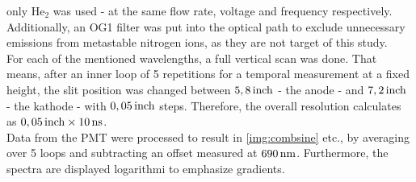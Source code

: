 \documentclass[a4paper,10pt,twoside]{article}
\begin{document}
			\begin{multicols*}{2}
			
				 only He$_2$ was used - at the same flow rate, voltage and frequency respectively. Additionally, an OG1 filter was put into the optical path to exclude unnecessary emissions from metastable nitrogen ions, as they are not target of this study.\\
				 For each of the mentioned wavelengths, a full vertical scan was done. That means, after an inner loop of 5 repetitions for a temporal measurement at a fixed height, the slit position was changed between $\unit[5,8]{inch}$ - the anode - and $\unit[7,2]{inch}$ - the kathode - with $\unit[0,05]{inch}$ steps. Therefore, the overall resolution calculates as $\unit[0,05]{inch}\times\unit[10]{ns}$.\\
				 Data from the PMT were processed to result in \autoref{img:combsine} etc., by averaging over 5 loops and subtracting an offset measured at $\unit[690]{nm}$. Furthermore, the spectra are displayed logarithmi to emphasize gradients. 
			
			\end{multicols*}
				
		\twocolumn
		
\end{document}
